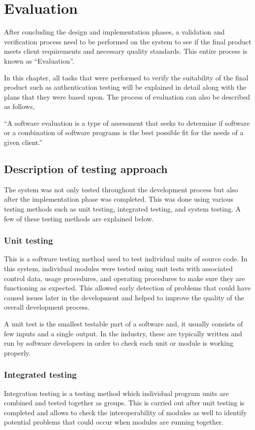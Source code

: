 \documentclass[12pt]{report}
\begin{document}
\chapter{Evaluation}
After concluding the design and implementation phases, a validation and verification process need to be performed on the system to see if the final product meets client requirements and necessary quality standards. This entire process is known as ``Evaluation''.

In this chapter, all tasks that were performed to verify the suitability of the final product such as authentication testing will be explained in detail along with the plans that they were based upon. The process of evaluation can also be described as follows,

``A software evaluation is a type of assessment that seeks to determine if software or a combination of software programs is the best possible fit for the needs of a given client.''\cite{tatum_2020_software_evaluation}


\section{Description of testing approach}
The system was not only tested throughout the development process but also after the implementation phase was completed. This was done using various testing methods such as unit testing, integrated testing, and system testing.
A few of these testing methods are explained below.

\subsection{Unit testing}
This is a software testing method used to test individual units of source code. In this system, individual modules were tested using unit tests with associated control data, usage procedures, and operating procedures to make sure they are functioning as expected. This allowed early detection of problems that could have caused issues later in the development and helped to improve the quality of the overall development process.

A unit test is the smallest testable part of a software and, it usually consists of few inputs and a single output. In the industry, these are typically written and run by software developers in order to check each unit or module is working properly.

\subsection{Integrated testing}
Integration testing is a testing method which individual program units are combined and tested together as groups. This is carried out after unit testing is completed and allows to check the interoperability of modules as well to identify potential problems that could occur when modules are running together.
\end{document}
